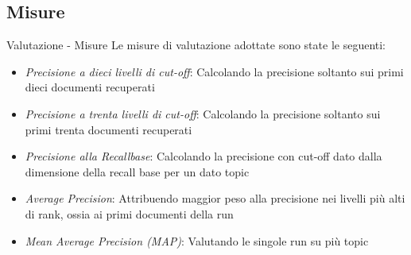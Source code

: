 \subsection{Misure}
\begin{frame}{Valutazione - Misure}
	Le misure di valutazione adottate sono state le seguenti:
	\begin{itemize}
		\item \textit{Precisione a dieci livelli di cut-off}: Calcolando la precisione soltanto sui primi dieci documenti recuperati
		\item \textit{Precisione a trenta livelli di cut-off}: Calcolando la precisione soltanto sui primi trenta documenti recuperati
		\item \textit{Precisione alla Recallbase}: Calcolando la precisione con cut-off dato dalla dimensione della recall base per un dato topic
		\item \textit{Average Precision}: Attribuendo maggior peso alla precisione nei livelli più alti di rank, ossia ai primi  documenti della run
		\item \textit{Mean Average Precision (MAP)}: Valutando le singole run su più topic
	\end{itemize}

	
\end{frame}